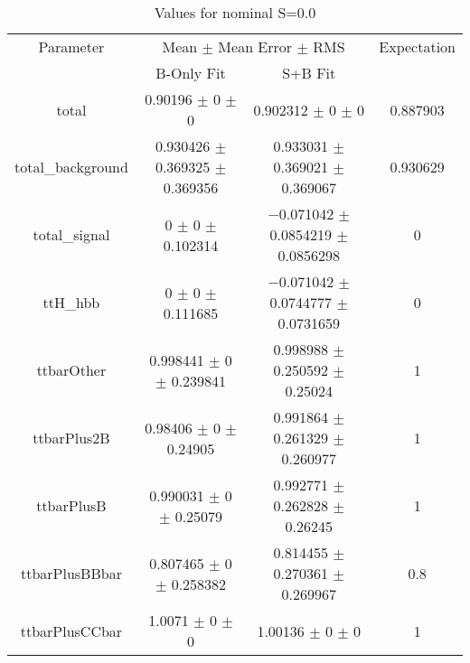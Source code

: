 \begin{table}
\centering
\caption{Values for nominal S=0.0}
\begin{tabular}{cccc}
\toprule
Parameter & \multicolumn{2}{c}{Mean $\pm$ Mean Error $\pm$ RMS} & Expectation\\
 & B-Only Fit & S+B Fit & \\
\midrule
total & \num{0.90196} $\pm$ \num{0} $\pm$ \num{0} & \num{0.902312} $\pm$ \num{0} $\pm$ \num{0} & \num{0.887903}\\
total\_background & \num{0.930426} $\pm$ \num{0.369325} $\pm$ \num{0.369356} & \num{0.933031} $\pm$ \num{0.369021} $\pm$ \num{0.369067} & \num{0.930629}\\
total\_signal & \num{0} $\pm$ \num{0} $\pm$ \num{0.102314} & \num{-0.071042} $\pm$ \num{0.0854219} $\pm$ \num{0.0856298} & \num{0}\\
ttH\_hbb & \num{0} $\pm$ \num{0} $\pm$ \num{0.111685} & \num{-0.071042} $\pm$ \num{0.0744777} $\pm$ \num{0.0731659} & \num{0}\\
ttbarOther & \num{0.998441} $\pm$ \num{0} $\pm$ \num{0.239841} & \num{0.998988} $\pm$ \num{0.250592} $\pm$ \num{0.25024} & \num{1}\\
ttbarPlus2B & \num{0.98406} $\pm$ \num{0} $\pm$ \num{0.24905} & \num{0.991864} $\pm$ \num{0.261329} $\pm$ \num{0.260977} & \num{1}\\
ttbarPlusB & \num{0.990031} $\pm$ \num{0} $\pm$ \num{0.25079} & \num{0.992771} $\pm$ \num{0.262828} $\pm$ \num{0.26245} & \num{1}\\
ttbarPlusBBbar & \num{0.807465} $\pm$ \num{0} $\pm$ \num{0.258382} & \num{0.814455} $\pm$ \num{0.270361} $\pm$ \num{0.269967} & \num{0.8}\\
ttbarPlusCCbar & \num{1.0071} $\pm$ \num{0} $\pm$ \num{0} & \num{1.00136} $\pm$ \num{0} $\pm$ \num{0} & \num{1}\\
\bottomrule
\end{tabular}
\end{table}